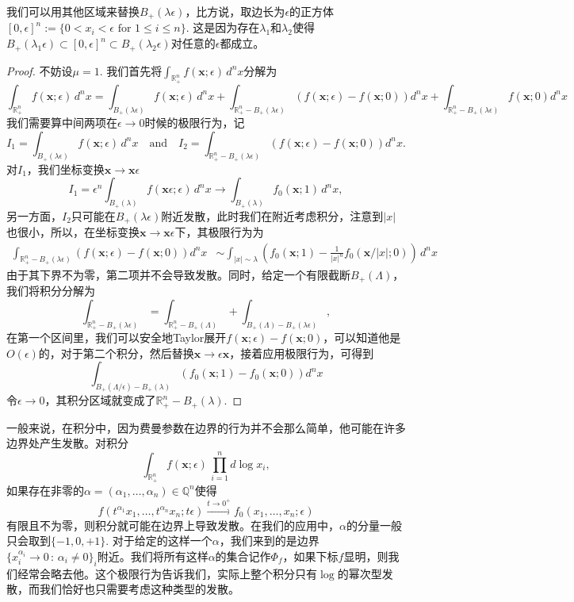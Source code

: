 \documentclass[12pt]{article}
\theoremstyle{definition}
\theoremstyle{plain}
\begin{document}
我们可以用其他区域来替换$B_+(\lambda \epsilon)$，比方说，取边长为$\epsilon$的正方体$[0,\epsilon]^n:=\{ 0<x_i<\epsilon \text{ for }1\leq i\leq n\}$. 这是因为存在$\lambda_1$和$\lambda_2$使得$B_+(\lambda_1\epsilon)\subset [0,\epsilon]^n\subset B_+(\lambda_2\epsilon)$对任意的$\epsilon$都成立。

\begin{proof}
不妨设$\mu=1$. 我们首先将$\int_{\mathbb R_+^n} f(\mathbf{x};\epsilon)\,d^nx$分解为
\[
\int_{\mathbb R_+^n} f(\mathbf{x};\epsilon)\,d^nx=\int_{B_+(\lambda \epsilon)} f(\mathbf{x};\epsilon)\,d^nx+\int_{\mathbb R_+^n - B_+(\lambda \epsilon)} (f(\mathbf{x};\epsilon)-f(\mathbf{x};0))d^nx + \int_{\mathbb R_+^n - B_+(\lambda \epsilon)} f(\mathbf{x};0)d^nx
\]
我们需要算中间两项在$\epsilon\to 0$时候的极限行为，记
\[
I_1=\int_{B_+(\lambda \epsilon)} f(\mathbf{x};\epsilon)\,d^nx
\quad \text{and} \quad
I_2=\int_{\mathbb R_+^n - B_+(\lambda \epsilon)} (f(\mathbf{x};\epsilon)-f(\mathbf{x};0))d^nx.
\]
对$I_1$，我们坐标变换$\mathbf{x}\to \mathbf{x}\epsilon$
\[
I_1=\epsilon^n\int_{B_+(\lambda)} f(\mathbf{x}\epsilon;\epsilon)\,d^nx
\to \int_{B_+(\lambda)} f_0(\mathbf{x};1)\,d^nx,
\]
另一方面，$I_2$只可能在$B_+(\lambda \epsilon)$附近发散，此时我们在附近考虑积分，注意到$|x|$也很小，所以，在坐标变换$\mathbf{x}\to \mathbf{x}\epsilon$下，其极限行为为
\[
\begin{aligned}
\int_{\mathbb R_+^n - B_+(\lambda \epsilon)} (f(\mathbf{x};\epsilon)-f(\mathbf{x};0))d^nx &\sim \int_{|x|\sim \lambda } \left(f_0(\mathbf{x};1)-\frac{1}{|x|^n}f_0(\mathbf{x}/|x|;0)\right)\,d^n x
\end{aligned}
\]
由于其下界不为零，第二项并不会导致发散。同时，给定一个有限截断$B_+(\Lambda)$，我们将积分分解为
\[
	\int_{\mathbb R_+^n - B_+(\lambda \epsilon)}=\int_{\mathbb R_+^n - B_+(\Lambda)}+\int_{B_+(\Lambda) - B_+(\lambda \epsilon)},
\]
在第一个区间里，我们可以安全地Taylor展开$f(\mathbf{x};\epsilon)-f(\mathbf{x};0)$，可以知道他是$O(\epsilon)$的，对于第二个积分，然后替换$\mathbf{x}\to \epsilon \mathbf{x}$，接着应用极限行为，可得到
\[
	\int_{B_+(\Lambda/\epsilon) - B_+(\lambda)}(f_0(\mathbf{x};1)-f_0(\mathbf{x};0))d^nx
\]
令$\epsilon\to 0$，其积分区域就变成了$\mathbb{R}_+^n-B_+(\lambda)$.
\end{proof}

一般来说，在积分中，因为费曼参数在边界的行为并不会那么简单，他可能在许多边界处产生发散。对积分
\[
	\int_{\mathbb R_+^n} f(\mathbf{x};\epsilon)\,\prod_{i=1}^n d\log x_i,
\]
如果存在非零的$\alpha=(\alpha_1,\dots,\alpha_n)\in \mathbb Q^n$使得
\[
f(t^{\alpha_1}x_1,\dots,t^{\alpha_n}x_n;t\epsilon)\xrightarrow{t\to 0^+}f_0(x_1,\dots,x_n;\epsilon)
\]
有限且不为零，则积分就可能在边界上导致发散。在我们的应用中，$\alpha$的分量一般只会取到$\{-1,0,+1\}$. 对于给定的这样一个$\alpha$，我们来到的是边界$\{x_i^{\alpha_i}\to 0\,:\,\alpha_i\neq 0\}_i$附近。我们将所有这样$\alpha$的集合记作$\Phi_f$，如果下标$f$显明，则我们经常会略去他。这个极限行为告诉我们，实际上整个积分只有$\log$的幂次型发散，而我们恰好也只需要考虑这种类型的发散。
\end{document}
